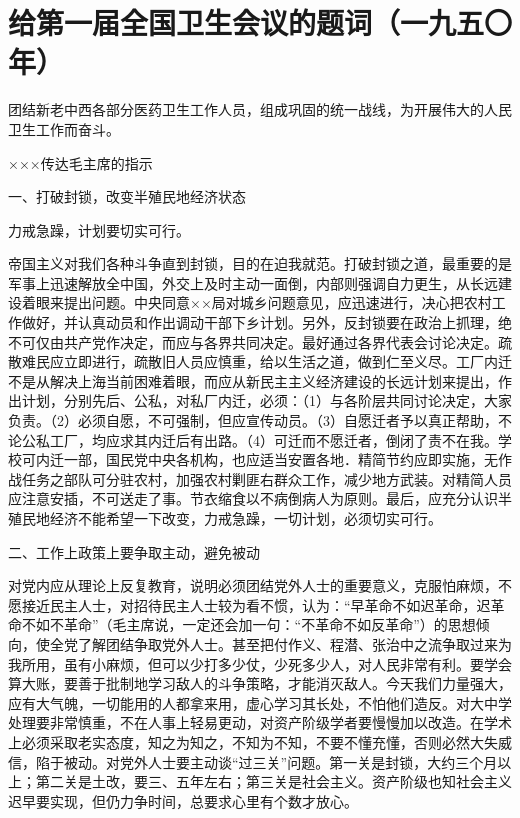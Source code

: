 \section[给第一届全国卫生会议的题词（一九五〇年）]{给第一届全国卫生会议的题词（一九五〇年）}


团结新老中西各部分医药卫生工作人员，组成巩固的统一战线，为开展伟大的人民卫生工作而奋斗。

×××传达毛主席的指示

一、打破封锁，改变半殖民地经济状态

力戒急躁，计划要切实可行。

帝国主义对我们各种斗争直到封锁，目的在迫我就范。打破封锁之道，最重要的是军事上迅速解放全中国，外交上及时主动一面倒，内部则强调自力更生，从长远建设着眼来提出问题。中央同意××局对城乡问题意见，应迅速进行，决心把农村工作做好，并认真动员和作出调动干部下乡计划。另外，反封锁要在政治上抓理，绝不可仅由共产党作决定，而应与各界共同决定。最好通过各界代表会讨论决定。疏散难民应立即进行，疏散旧人员应慎重，给以生活之道，做到仁至义尽。工厂内迁不是从解决上海当前困难着眼，而应从新民主主义经济建设的长远计划来提出，作出计划，分别先后、公私，对私厂内迁，必须：（1）与各阶层共同讨论决定，大家负责。（2）必须自愿，不可强制，但应宣传动员。（3）自愿迁者予以真正帮助，不论公私工厂，均应求其内迁后有出路。（4）可迁而不愿迁者，倒闭了责不在我。学校可内迁一部，国民党中央各机构，也应适当安置各地．精简节约应即实施，无作战任务之部队可分驻农村，加强农村剿匪右群众工作，减少地方武装。对精简人员应注意安插，不可送走了事。节衣缩食以不病倒病人为原则。最后，应充分认识半殖民地经济不能希望一下改变，力戒急躁，一切计划，必须切实可行。

二、工作上政策上要争取主动，避免被动

对党内应从理论上反复教育，说明必须团结党外人士的重要意义，克服怕麻烦，不愿接近民主人士，对招待民主人士较为看不惯，认为：“早革命不如迟革命，迟革命不如不革命”（毛主席说，一定还会加一句：“不革命不如反革命”）的思想倾向，使全党了解团结争取党外人士。甚至把付作义、程潜、张治中之流争取过来为我所用，虽有小麻烦，但可以少打多少仗，少死多少人，对人民非常有利。要学会算大账，要善于批制地学习敌人的斗争策略，才能消灭敌人。今天我们力量强大，应有大气魄，一切能用的人都拿来用，虚心学习其长处，不怕他们造反。对大中学处理要非常慎重，不在人事上轻易更动，对资产阶级学者要慢慢加以改造。在学术上必须采取老实态度，知之为知之，不知为不知，不要不懂充懂，否则必然大失威信，陷于被动。对党外人士要主动谈“过三关”问题。第一关是封锁，大约三个月以上；第二关是土改，要三、五年左右；第三关是社会主义。资产阶级也知社会主义迟早要实现，但仍力争时间，总要求心里有个数才放心。

